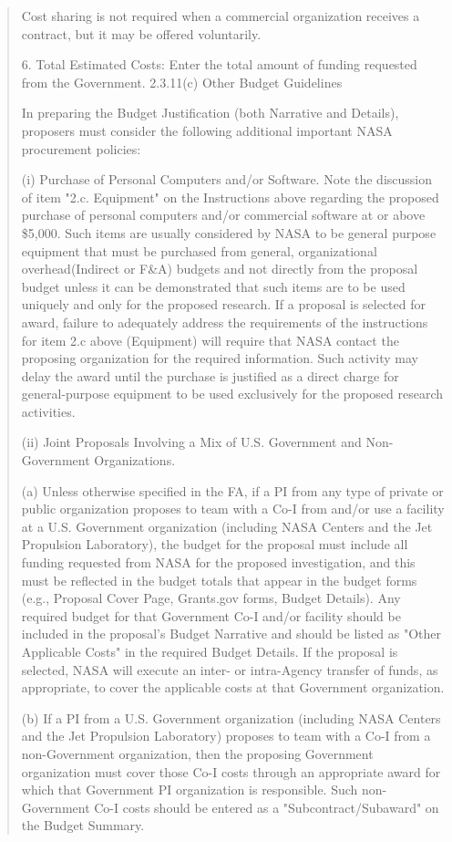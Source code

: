 \documentclass[12pt]{article}
\begin{document}
\begin{quote}
Cost sharing is not required when a commercial organization receives a
contract, but it may be offered voluntarily.


6. Total Estimated Costs: Enter the total amount of funding requested
   from the Government. 2.3.11(c) Other Budget Guidelines

In preparing the Budget Justification (both Narrative and Details),
proposers must consider the following additional important NASA
procurement policies:

(i) Purchase of Personal Computers and/or Software. Note the
discussion of item "2.c. Equipment" on the Instructions above
regarding the proposed purchase of personal computers and/or
commercial software at or above \$5,000. Such items are usually
considered by NASA to be general purpose equipment that must be
purchased from general, organizational overhead(Indirect or F\&A)
budgets and not directly from the proposal budget unless it can be
demonstrated that such items are to be used uniquely and only for the
proposed research. If a proposal is selected for award, failure to
adequately address the requirements of the instructions for item 2.c
above (Equipment) will require that NASA contact the proposing
organization for the required information. Such activity may delay the
award until the purchase is justified as a direct charge for
general-purpose equipment to be used exclusively for the proposed
research activities.

(ii) Joint Proposals Involving a Mix of U.S. Government and
Non-Government Organizations.

(a) Unless otherwise specified in the FA, if a PI from any type of
private or public organization proposes to team with a Co-I from
and/or use a facility at a U.S. Government organization (including
NASA Centers and the Jet Propulsion Laboratory), the budget for the
proposal must include all funding requested from NASA for the proposed
investigation, and this must be reflected in the budget totals that
appear in the budget forms (e.g., Proposal Cover Page, Grants.gov
forms, Budget Details). Any required budget for that Government Co-I
and/or facility should be included in the proposal's Budget Narrative
and should be listed as "Other Applicable Costs" in the required
Budget Details. If the proposal is selected, NASA will execute an
inter- or intra-Agency transfer of funds, as appropriate, to cover the
applicable costs at that Government organization.

(b) If a PI from a U.S. Government organization (including NASA
Centers and the Jet Propulsion Laboratory) proposes to team with a
Co-I from a non-Government organization, then the proposing Government
organization must cover those Co-I costs through an appropriate award
for which that Government PI organization is responsible. Such
non-Government Co-I costs should be entered as a
"Subcontract/Subaward" on the Budget Summary.


\end{quote}
\end{document}
